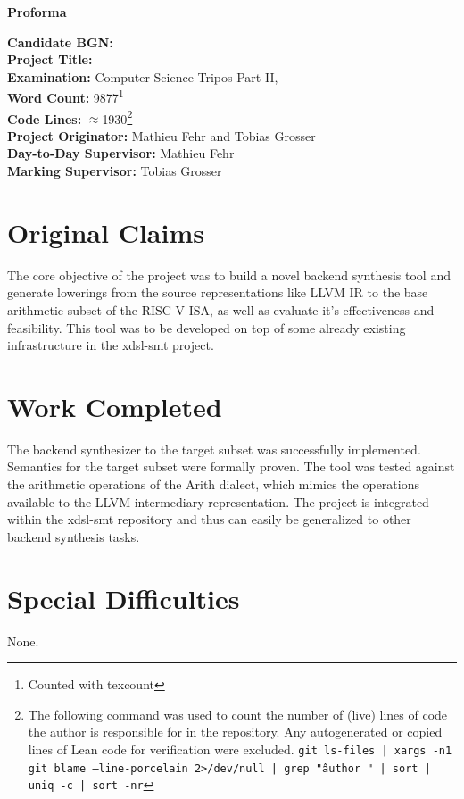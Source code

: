 \begin{center}
\Large\textbf{Proforma}
\end{center}

\noindent
\textbf{Candidate BGN:} \myBGN \\
\textbf{Project Title:} \myTitle \\
\textbf{Examination:} Computer Science Tripos Part II, \myYear \\
\textbf{Word Count:} 9877\footnote{Counted with texcount} \\
\textbf{Code Lines:} $\approx$1930\footnote{The following command was used to count
the number of (live) lines of code the author is responsible for in the repository. 
Any autogenerated or copied lines of Lean code for verification were excluded. 
\texttt{git ls-files | xargs -n1 git blame --line-porcelain 2>/dev/null | 
grep "\^author " | sort | uniq -c | sort -nr}} \\
\textbf{Project Originator:} Mathieu Fehr and Tobias Grosser\\
\textbf{Day-to-Day Supervisor:} Mathieu Fehr \\
\textbf{Marking Supervisor:} Tobias Grosser \\

\section*{Original Claims}
The core objective of the project was to build a novel  
backend synthesis tool and generate lowerings from the source representations
like LLVM IR to the base arithmetic subset of the RISC-V ISA, as well as evaluate
it's effectiveness and feasibility. This tool was to be developed on top of some
already existing infrastructure in the xdsl-smt project.

\section*{Work Completed}
The backend synthesizer to the target subset was successfully implemented. Semantics
for the target subset were formally proven. The tool was tested against the arithmetic
operations of the Arith dialect, which mimics the operations available to the LLVM
intermediary representation. The project is integrated within the xdsl-smt repository
and thus can easily be generalized to other backend synthesis tasks.

\section*{Special Difficulties}
None.